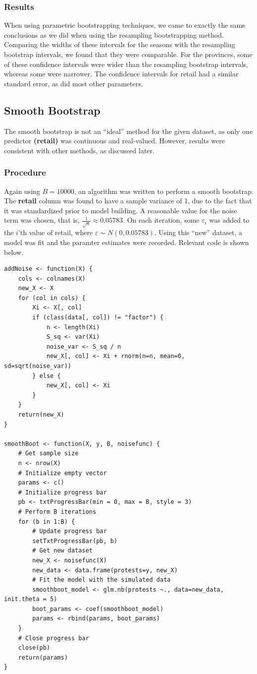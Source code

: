 \documentclass[12pt]{article}
\begin{document}
\subsubsection*{Results}
When using parametric bootstrapping techniques, we came to exactly the same conclusions as we did when using the resampling bootstrapping method. Comparing the widths of these intervals for the seasons with the resampling bootstrap intervals, we found that they were comparable. For the provinces, some of these confidence intervals were wider than the resampling bootstrap intervals, whereas some were narrower. The confidence intervals for retail had a similar standard error, as did most other parameters.



\subsection{Smooth Bootstrap}
The smooth bootstrap is not an ``ideal'' method for the given dataset, as only one predictor \textbf{(retail)} was continuous and real-valued. However, results were consistent with other methods, as discussed later.

\subsubsection*{Procedure}
Again using $B = 10000$, an algorithm was written to perform a smooth bootstrap. The \textbf{retail} column was found to have a sample variance of 1, due to the fact that it was standardized prior to model building. A reasonable value for the noise term was chosen, that is, $\frac{1}{\sqrt{n}} \approx 0.05783$. On each iteration, some $\varepsilon_i$ was added to the $i$'th value of retail, where $\varepsilon \sim N(0, 0.05783)$. Using this ``new'' dataset, a model was fit and the paramter estimates were recorded. Relevant code is shown below.

\clearpage
\begin{lstlisting}
addNoise <- function(X) {
    cols <- colnames(X)
    new_X <- X
    for (col in cols) {
        Xi <- X[, col]
        if (class(data[, col]) != "factor") {
            n <- length(Xi)
            S_sq <- var(Xi)
            noise_var <- S_sq / n
            new_X[, col] <- Xi + rnorm(n=n, mean=0, sd=sqrt(noise_var))
        } else {
            new_X[, col] <- Xi
        }
    }
    return(new_X)
}

smoothBoot <- function(X, y, B, noisefunc) {
    # Get sample size
    n <- nrow(X)
    # Initialize empty vector
    params <- c()
    # Initialize progress bar
    pb <- txtProgressBar(min = 0, max = B, style = 3)
    # Perform B iterations
    for (b in 1:B) {
        # Update progress bar
        setTxtProgressBar(pb, b)
        # Get new dataset
        new_X <- noisefunc(X)
        new_data <- data.frame(protests=y, new_X)
        # Fit the model with the simulated data
        smoothboot_model <- glm.nb(protests ~., data=new_data, init.theta = 5)
        boot_params <- coef(smoothboot_model)
        params <- rbind(params, boot_params)
    }
    # Close progress bar
    close(pb)
    return(params)
}
\end{lstlisting}
\end{document}
